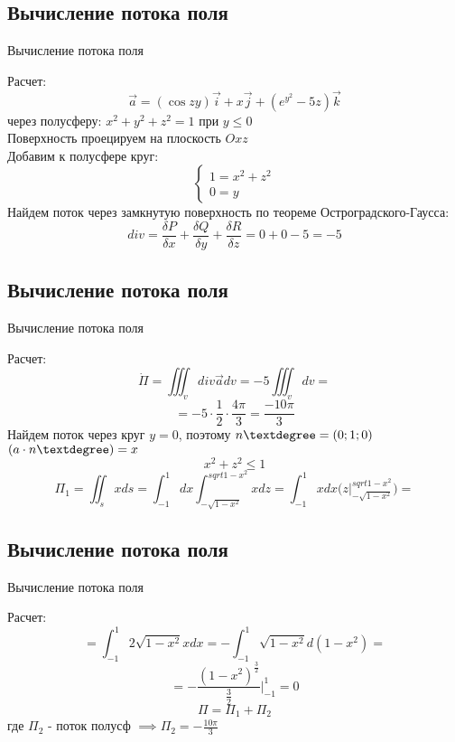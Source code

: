 
\subsection{Вычисление потока поля}
\begin{frame}{Вычисление потока поля}
\begin{block}{Расчет:}
\centering
$$\Vec{a} = (\cos{zy})\Vec{i} + x\Vec{j} + (e^{y^{2}} - 5z)\Vec{k}$$
через полусферу:
$x^{2} + y^{2} + z^{2} = 1 $ при $y \leq 0$ \\
Поверхность проецируем на плоскость $Oxz$ \\
Добавим к полусфере круг:
\[
\begin{cases}
    1 = x^{2} + z^{2} \\
    0 = y
\end{cases}
\]
Найдем поток через замкнутую поверхность по теореме Остроградского-Гаусса:
$$
div = \frac{\delta P}{\delta x} + \frac{\delta Q}{\delta y} + \frac{\delta R}{\delta z} = 0 + 0 - 5 = -5
$$
\end{block}  
\end{frame}


\subsection{Вычисление потока поля}
\begin{frame}{Вычисление потока поля}
\begin{block}{Расчет:}
\centering
$$
\dot{\Pi} = \iiint_{v} div \Vec{a} dv = -5\iiint_{v} dv = 
$$
$$
= -5 \cdot \frac{1}{2} \cdot \frac{4\pi}{3} = \frac{-10\pi}{3}
$$
Найдем поток через круг $y = 0$, поэтому $n\textdegree = (0; 1; 0)$ \\
$(a \cdot n\textdegree) = x$
$$
x^{2} + z^{2} \leq 1
$$
$$
\Pi_{1} = \iint_{s} xds = \int_{-1}^{1} dx \int_{-\sqrt{1-x^{2}}} ^{sqrt{1-x^{2}}} xdz = \int_{-1} ^{1} xdx \bigg( z\bigg|_{-\sqrt{1-x^{2}}} ^{sqrt{1-x^{2}}} \bigg) =
$$
\end{block}  
\end{frame}


\subsection{Вычисление потока поля}
\begin{frame}{Вычисление потока поля}
\begin{block}{Расчет:}
\centering
$$
= \int_{-1} ^{1} 2\sqrt{1-x^{2}}xdx = - \int_{-1}^{1} \sqrt{1-x^{2}} d(1-x^{2}) =
$$
$$
= - \frac{(1-x^{2})^{\frac{3}{2}}}{\frac{3}{2}}\bigg|_{-1}^{1} = 0
$$
$$\Pi = \Pi_1 + \Pi_2$$ 
где $\Pi_{2}$ - поток полусф $\implies \Pi_2 = - \frac{10\pi}{3} $
\end{block}  
\end{frame}
